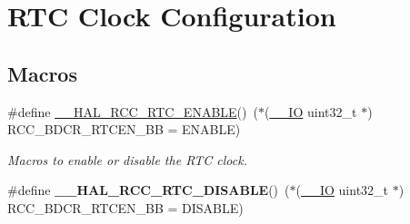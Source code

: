 \hypertarget{group___r_c_c___internal___r_t_c___clock___configuration}{}\section{R\+TC Clock Configuration}
\label{group___r_c_c___internal___r_t_c___clock___configuration}
\subsection*{Macros}
\begin{DoxyCompactItemize}
\item 
\#define \hyperlink{group___r_c_c___internal___r_t_c___clock___configuration_gab7cc36427c31da645a0e38e181f8ce0f}{\+\_\+\+\_\+\+H\+A\+L\+\_\+\+R\+C\+C\+\_\+\+R\+T\+C\+\_\+\+E\+N\+A\+B\+LE}()~($\ast$(\hyperlink{core__sc300_8h_aec43007d9998a0a0e01faede4133d6be}{\+\_\+\+\_\+\+IO} uint32\+\_\+t $\ast$) R\+C\+C\+\_\+\+B\+D\+C\+R\+\_\+\+R\+T\+C\+E\+N\+\_\+\+BB = E\+N\+A\+B\+LE)
\begin{DoxyCompactList}\small\item\em Macros to enable or disable the R\+TC clock. \end{DoxyCompactList}\item 
\#define {\bfseries \+\_\+\+\_\+\+H\+A\+L\+\_\+\+R\+C\+C\+\_\+\+R\+T\+C\+\_\+\+D\+I\+S\+A\+B\+LE}()~($\ast$(\hyperlink{core__sc300_8h_aec43007d9998a0a0e01faede4133d6be}{\+\_\+\+\_\+\+IO} uint32\+\_\+t $\ast$) R\+C\+C\+\_\+\+B\+D\+C\+R\+\_\+\+R\+T\+C\+E\+N\+\_\+\+BB = D\+I\+S\+A\+B\+LE)\hypertarget{group___r_c_c___internal___r_t_c___clock___configuration_gaab5eeb81fc9f0c8d4450069f7a751855}{}\label{group___r_c_c___internal___r_t_c___clock___configuration_gaab5eeb81fc9f0c8d4450069f7a751855}


\end{DoxyCompactItemize}
